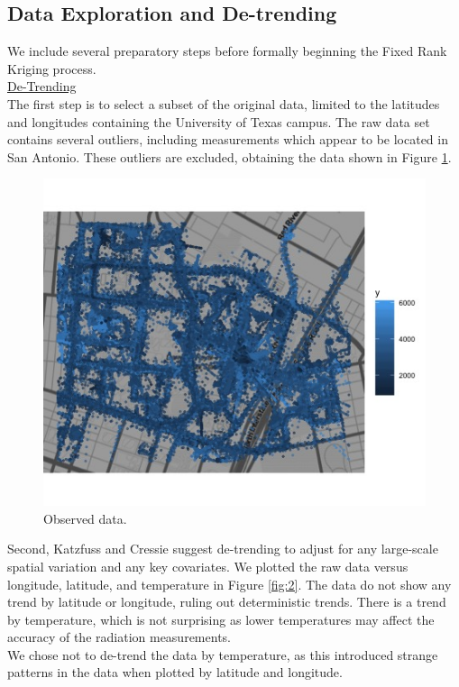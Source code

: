 \documentclass[11pt]{article}
\begin{document}
\subsection{Data Exploration and De-trending}
We include several preparatory steps before formally beginning the Fixed Rank Kriging process.\\

\underline{De-Trending}\\

The first step is to select a subset of the original data, limited to the latitudes and longitudes containing the University of Texas campus.  The raw data set contains several outliers, including measurements which appear to be located in San Antonio.  These outliers are excluded, obtaining the data shown in Figure \ref{fig:1}. \\

\begin{figure}[H]
\centering
\includegraphics[width=0.7\columnwidth]{Images/original_data_plot.jpg}
\caption{Observed data.}
\label{fig:1}
\end{figure}

Second, Katzfuss and Cressie suggest de-trending to adjust for any large-scale spatial variation and any key covariates.  We plotted the raw data versus longitude, latitude, and temperature in Figure \ref{fig:2}.  The data do not show any trend by latitude or longitude, ruling out deterministic trends.  There is a trend by temperature, which is not surprising as lower temperatures may affect the accuracy of the radiation measurements. \\

We chose not to de-trend the data by temperature, as this introduced strange patterns in the data when plotted by latitude and longitude. \\
\end{document}
